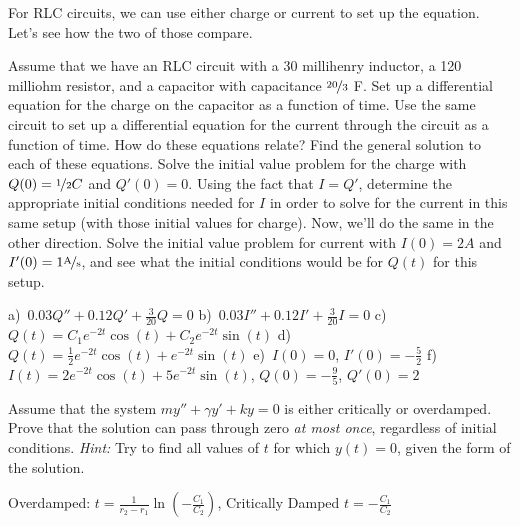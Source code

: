 \begin{exercise}
For RLC circuits, we can use either charge or current to set up the equation. Let's see how the two of those compare.
\begin{tasks}
\task Assume that we have an RLC circuit with a 30 millihenry inductor, a 120 milliohm resistor, and a capacitor with capacitance $\nicefrac{20}{3}$ F. Set up a differential equation for the charge on the capacitor as a function of time.
\task Use the same circuit to set up a differential equation for the current through the circuit as a function of time. How do these equations relate?
\task Find the general solution to each of these equations. 
\task Solve the initial value problem for the charge with $Q(0) = \nicefrac{1}{2} C$ and $Q'(0) = 0$.
\task Using the fact that $I = Q'$, determine the appropriate initial conditions needed for $I$ in order to solve for the current in this same setup (with those initial values for charge).
\task Now, we'll do the same in the other direction. Solve the initial value problem for current with $I(0) = 2 A$ and $I'(0) = 1 \unitfrac{A}{s}$, and see what the initial conditions would be for $Q(t)$ for this setup.    
\end{tasks}
\end{exercise}
\comboSol{%
}
{%
a)~$0.03Q'' + 0.12Q' + \frac{3}{20}Q = 0$ \quad
b)~$0.03I'' + 0.12I' + \frac{3}{20}I = 0$ \quad
c)~$Q(t) = C_1e^{-2t}\cos(t) + C_2e^{-2t}\sin(t)$ \quad
d)~$Q(t) = \frac{1}{2}e^{-2t}\cos(t) + e^{-2t}\sin(t)$ \quad
e)~$I(0) = 0$, $I'(0) = -\frac{5}{2}$ \quad
f)~$I(t) = 2e^{-2t}\cos(t) + 5e^{-2t}\sin(t)$, $Q(0) = -\frac{9}{5}$, $Q'(0) = 2$
}

\begin{exercise}
Assume that the system $my'' + \gamma y' + ky = 0$ is either critically or overdamped. Prove that the solution can pass through zero \emph{at most once}, regardless of initial conditions. \emph{Hint:} Try to find all values of $t$ for which $y(t) = 0$, given the form of the solution.
\end{exercise}
\comboSol{%
}
{%
Overdamped: $t = \frac{1}{r_2 - r_1}\ln\left(-\frac{C_1}{C_2}\right)$, Critically Damped $t = -\frac{C_1}{C_2}$
}

\setcounter{exercise}{100}


